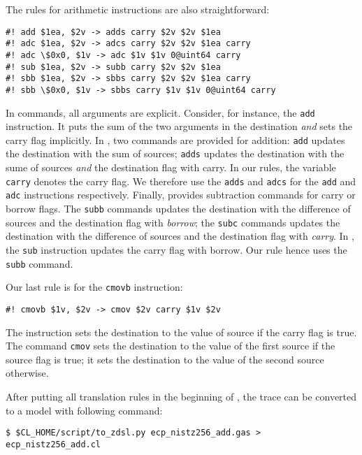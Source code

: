 \documentclass{amsproc}
\begin{document}
The rules for arithmetic instructions are also straightforward:
\begin{verbatim}
#! add $1ea, $2v -> adds carry $2v $2v $1ea
#! adc $1ea, $2v -> adcs carry $2v $2v $1ea carry
#! adc \$0x0, $1v -> adc $1v $1v 0@uint64 carry
#! sub $1ea, $2v -> subb carry $2v $2v $1ea
#! sbb $1ea, $2v -> sbbs carry $2v $2v $1ea carry
#! sbb \$0x0, $1v -> sbbs carry $1v $1v 0@uint64 carry
\end{verbatim}
In \cryptoline commands, all arguments are explicit. Consider, for
instance, the \xeightysix \texttt{add} instruction. It puts the sum of the
two arguments in the destination \emph{and} sets the carry flag
implicitly. In \cryptoline, two commands are provided for addition:
\texttt{add} updates the destination with the sum of sources;
\texttt{adds} updates the destination with the sume of sources
\emph{and} the destination flag with carry. In our rules, the
\cryptoline variable \texttt{carry} denotes the carry flag. We
therefore use the \texttt{adds} and \texttt{adcs} for the \xeightysix
\texttt{add} and \texttt{adc} instructions respectively. Finally,
\cryptoline provides subtraction commands for carry or borrow
flags. The \texttt{subb} commands updates the destination with the
difference of sources and the destination flag with \emph{borrow}; the
\texttt{subc} commands updates the destination with the difference of
sources and the destination flag with \emph{carry}. In \xeightysix, the
\texttt{sub} instruction updates the carry flag with borrow. Our rule
hence uses the \cryptoline \texttt{subb} command.

Our last rule is for the \xeightysix \texttt{cmovb} instruction:
\begin{verbatim}
#! cmovb $1v, $2v -> cmov $2v carry $1v $2v
\end{verbatim}
The instruction sets the destination to the value of source if the
carry flag is true. The \cryptoline command \texttt{cmov} sets the
destination to the value of the first source if the source flag is
true; it sets the destination to the value of the second source
otherwise.

After putting all translation rules in the beginning of \nistzaddgas,
the \xeightysix trace can be converted to a \cryptoline model with
following command:
\begin{verbatim}
$ $CL_HOME/script/to_zdsl.py ecp_nistz256_add.gas > ecp_nistz256_add.cl
\end{verbatim}
\end{document}
